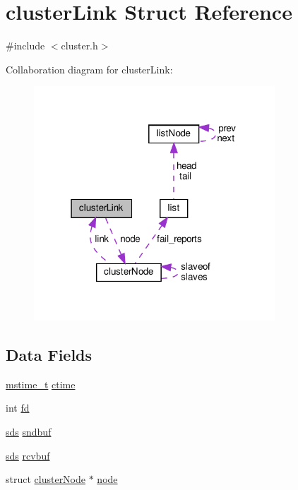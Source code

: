 \hypertarget{structcluster_link}{}\section{cluster\+Link Struct Reference}
\label{structcluster_link}


{\ttfamily \#include $<$cluster.\+h$>$}



Collaboration diagram for cluster\+Link\+:
\nopagebreak
\begin{figure}[H]
\begin{center}
\leavevmode
\includegraphics[width=256pt]{structcluster_link__coll__graph}
\end{center}
\end{figure}
\subsection*{Data Fields}
\begin{DoxyCompactItemize}
\item 
\hyperlink{redismodule_8h_a652ae61e2475bc8957454534544968fc}{mstime\+\_\+t} \hyperlink{structcluster_link_a7e18258d5320891f16483de560a5a551}{ctime}
\item 
int \hyperlink{structcluster_link_a6f8059414f0228f0256115e024eeed4b}{fd}
\item 
\hyperlink{sds_8h_ad69abac3df4532879db9642c95f5ef6f}{sds} \hyperlink{structcluster_link_a3bedcd2fc8781d7cfc9239ecb3311ae2}{sndbuf}
\item 
\hyperlink{sds_8h_ad69abac3df4532879db9642c95f5ef6f}{sds} \hyperlink{structcluster_link_a3d5d75102832a2536981164afad5f218}{rcvbuf}
\item 
struct \hyperlink{structcluster_node}{cluster\+Node} $\ast$ \hyperlink{structcluster_link_a7aa2bc440db9dc659120a310878cac0f}{node}
\end{DoxyCompactItemize}


